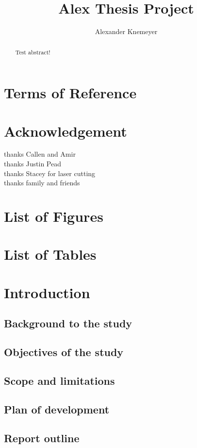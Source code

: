 \documentclass{article}
\begin{document}
\title{Alex Thesis Project}
\author{Alexander Knemeyer}

\maketitle
\section{Terms of Reference}

\section{Acknowledgement}
thanks Callen and Amir\\
thanks Justin Pead\\
thanks Stacey for laser cutting\\
thanks family and friends

\begin{abstract}
Test abstract!
\end{abstract}

\section{List of Figures}

\section{List of Tables}

\section{Introduction}
\subsection{Background to the study}
\subsection{Objectives of the study}
\subsection{Scope and limitations}
\subsection{Plan of development}
\subsection{Report outline}
\end{document}
